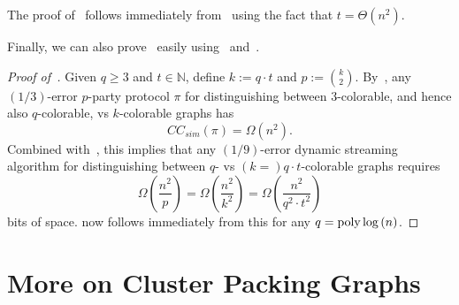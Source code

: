 \documentclass[11pt]{article}
\theoremstyle{definition}
\renewcommand{\geq}{\geqslant}
\newcommand{\IN}{\ensuremath{\mathbb{N}}}
\newcommand{\poly}{\mbox{\rm poly}}
\begin{document}
The proof of~ follows immediately from~ using the fact that $t = \Theta(n^2)$. 

Finally, we can also prove~ easily using~ and~. 

\begin{proof}[Proof of~]
Given $q \geq 3$ and $t \in \IN$, define $k := q \cdot t$ and $p := \binom{k}{2}$. By~, any $(1/3)$-error $p$-party protocol $\pi$ for distinguishing between $3$-colorable, and hence also $q$-colorable, vs $k$-colorable graphs 
has 
\[
	CC_{sim}(\pi) = \Omega(n^2). 
\]
Combined with~, this implies that any $(1/9)$-error dynamic streaming algorithm for distinguishing between $q$- vs $(k=) q \cdot t$-colorable graphs requires 
\[
	\Omega(\frac{n^2}{p}) = \Omega(\frac{n^2}{k^2}) = \Omega(\frac{n^2}{q^2 \cdot t^2}) 
\]
bits of space.  now follows immediately from this for any $q = \poly\log{(n)}$. 
\end{proof}

	
	\clearpage






	
	\clearpage
	
\appendix
	

\newcommand{\embed}{\ensuremath{\textnormal{\textsc{embed}}}}

\newcommand{\upc}{\ensuremath{\textnormal{\textsf{UPC}}}}

\newcommand{\startvert}{\ensuremath{\textnormal{\textsc{start}}}}
\newcommand{\finalvert}{\ensuremath{\textnormal{\textsc{final}}}}

\newcommand{\Gdup}{\ensuremath{G_{\textsc{dup}}}}
\newcommand{\cP}{\ensuremath{\mathcal{P}}}
\newcommand{\cH}{\ensuremath{\mathcal{H}}}
\section{More on Cluster Packing Graphs}\label{app:cpg} 
\end{document}
